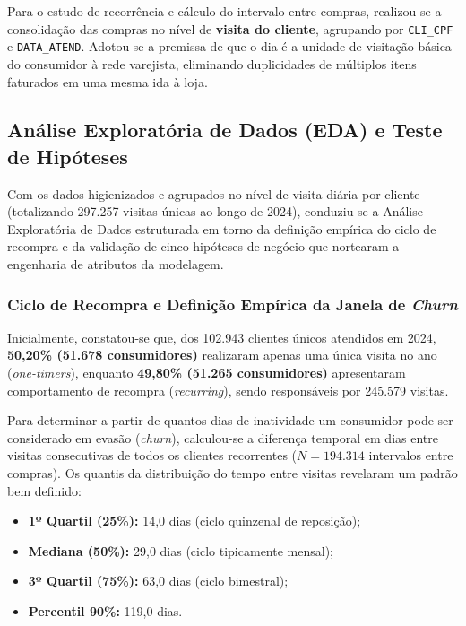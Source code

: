Para o estudo de recorrência e cálculo do intervalo entre compras, realizou-se a consolidação das compras no nível de \textbf{visita do cliente}, agrupando por \texttt{CLI\_CPF} e \texttt{DATA\_ATEND}. Adotou-se a premissa de que o dia é a unidade de visitação básica do consumidor à rede varejista, eliminando duplicidades de múltiplos itens faturados em uma mesma ida à loja.

\subsection{Análise Exploratória de Dados (EDA) e Teste de Hipóteses}\label{subsec:eda}

Com os dados higienizados e agrupados no nível de visita diária por cliente (totalizando 297.257 visitas únicas ao longo de 2024), conduziu-se a Análise Exploratória de Dados estruturada em torno da definição empírica do ciclo de recompra e da validação de cinco hipóteses de negócio que nortearam a engenharia de atributos da modelagem.

\subsubsection{Ciclo de Recompra e Definição Empírica da Janela de \textit{Churn}}
Inicialmente, constatou-se que, dos 102.943 clientes únicos atendidos em 2024, \textbf{50,20\% (51.678 consumidores)} realizaram apenas uma única visita no ano (\textit{one-timers}), enquanto \textbf{49,80\% (51.265 consumidores)} apresentaram comportamento de recompra (\textit{recurring}), sendo responsáveis por 245.579 visitas.

Para determinar a partir de quantos dias de inatividade um consumidor pode ser considerado em evasão (\textit{churn}), calculou-se a diferença temporal em dias entre visitas consecutivas de todos os clientes recorrentes ($N = 194.314$ intervalos entre compras). Os quantis da distribuição do tempo entre visitas revelaram um padrão bem definido:
\begin{itemize}[leftmargin=*]
    \item \textbf{1º Quartil (25\%):} 14,0 dias (ciclo quinzenal de reposição);
    \item \textbf{Mediana (50\%):} 29,0 dias (ciclo tipicamente mensal);
    \item \textbf{3º Quartil (75\%):} 63,0 dias (ciclo bimestral);
    \item \textbf{Percentil 90\%:} 119,0 dias.
\end{itemize}

